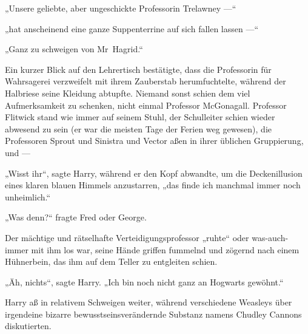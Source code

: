 „Unsere geliebte, aber ungeschickte Professorin Trelawney —“

„hat anscheinend eine ganze Suppenterrine auf sich fallen lassen —“

„Ganz zu schweigen von Mr~Hagrid.“

Ein kurzer Blick auf den Lehrertisch bestätigte, dass die Professorin für Wahrsagerei verzweifelt mit ihrem Zauberstab herumfuchtelte, während der Halbriese seine Kleidung abtupfte. Niemand sonst schien dem viel Aufmerksamkeit zu schenken, nicht einmal Professor McGonagall. Professor Flitwick stand wie immer auf seinem Stuhl, der Schulleiter schien wieder abwesend zu sein (er war die meisten Tage der Ferien weg gewesen), die Professoren Sprout und Sinistra und Vector aßen in ihrer üblichen Gruppierung, und —

„Wisst ihr“, sagte Harry, während er den Kopf abwandte, um die Deckenillusion eines klaren blauen Himmels anzustarren, „das finde ich manchmal immer noch unheimlich.“

„Was denn?“ fragte Fred oder George.

Der mächtige und rätselhafte Verteidigungsprofessor „ruhte“ oder was-auch-immer mit ihm los war, seine Hände griffen fummelnd und zögernd nach einem Hühnerbein, das ihm auf dem Teller zu entgleiten schien.

„Äh, nichts“, sagte Harry.
„Ich bin noch nicht ganz an Hogwarts gewöhnt.“

Harry aß in relativem Schweigen weiter, während verschiedene Weasleys über irgendeine bizarre bewusstseinsverändernde Substanz namens Chudley Cannons diskutierten.

